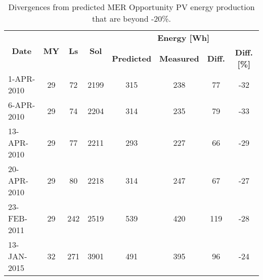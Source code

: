 \begin{table}[h]
    \footnotesize
    \centering
    \caption{Divergences from predicted MER Opportunity PV energy production that are beyond -20\%.}
    \label{tab:divergences-less-than-m20pc}
    \begin{tabular}{|l|c|c|c|c|c|c|c|}
    \hline
    \multicolumn{1}{|c|}{\multirow{2}{*}{\textbf{Date}}} & \multirow{2}{*}{\textbf{MY}} & \multirow{2}{*}{\textbf{Ls}} & \multirow{2}{*}{\textbf{Sol}} & \multicolumn{4}{c|}{\textbf{Energy [Wh]}} \\ \cline{5-8}
    \multicolumn{1}{|c|}{} &  &  &  & \textbf{Predicted} & \textbf{Measured} & \textbf{Diff.} & \textbf{Diff. [\%]} \\ \hline
    1-APR-2010 & 29 & 72 & 2199 & 315 & 238 & 77 & -32 \\
    6-APR-2010 & 29 & 74 & 2204 & 314 & 235 & 79 & -33 \\
    13-APR-2010 & 29 & 77 & 2211 & 293 & 227 & 66 & -29 \\
    20-APR-2010 & 29 & 80 & 2218 & 314 & 247 & 67 & -27 \\ \hline
    23-FEB-2011 & 29 & 242 & 2519 & 539 & 420 & 119 & -28 \\ \hline
    13-JAN-2015 & 32 & 271 & 3901 & 491 & 395 & 96 & -24 \\ \hline
    \end{tabular}
\end{table}
